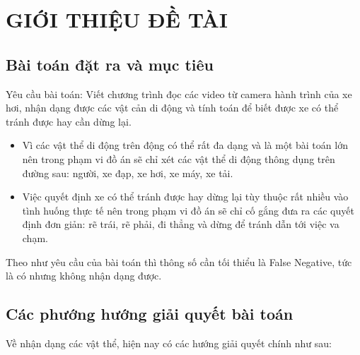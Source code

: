\chapter {GIỚI THIỆU ĐỀ TÀI}

\renewcommand{\chaptermark}[1]{\markboth{ Ch\thechapter:\ #1}{}}



\chaptermark{Giới thiệu đề tài}
	
\section{Bài toán đặt ra và mục tiêu}
	Yêu cầu bài toán: Viết chương trình đọc các video từ camera hành trình của xe hơi, nhận dạng được các vật cản di động và tính toán để biết được xe có thể tránh được hay cần dừng lại.
	\begin{itemize}
	  \item Vì các vật thể di động trên động có thể rất đa dạng và là một bài toán lớn nên trong phạm vi đồ án sẽ chỉ xét các vật thể di động thông dụng trên đường sau: người, xe đạp, xe hơi, xe máy, xe tải.
	  \item Việc quyết định xe có thể tránh được hay dừng lại tùy thuộc rất nhiều vào tình huống thực tế nên trong phạm vi đồ án sẽ chỉ cố gắng đưa ra các quyết định đơn giản: rẽ trái, rẽ phải, đi thẳng và dừng để tránh dẫn tới việc va chạm.
	\end{itemize}

	Theo như yêu cầu của bài toán thì thông số cần tối thiểu là False Negative, tức là có nhưng không nhận dạng được.
	

\section{Các phướng hướng giải quyết bài toán}
	Về nhận dạng các vật thể, hiện nay có các hướng giải quyết chính như sau:

